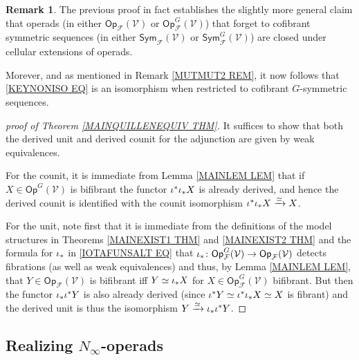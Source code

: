 \documentclass[a4paper,10pt
,draft
]{article}%
\numberwithin{equation}{section}
\numberwithin{figure}{section}
\theoremstyle{definition} %
\newtheorem{remark}[equation]{Remark}%
\newcommand{\1}{\ensuremath{\mathbbm 1}}%
\begin{document}
\begin{remark}\label{INFACTEST REM}
The previous proof in fact establishes 
the slightly more general claim that operads 
(in either 
$\mathsf{Op}_{\mathcal{F}}(\mathcal{V})$ or
$\mathsf{Op}_{\mathcal{F}}^G(\mathcal{V})$)
that forget to cofibrant symmetric sequences
(in either 
$\mathsf{Sym}_{\mathcal{F}}(\mathcal{V})$ or
$\mathsf{Sym}_{\mathcal{F}}^G(\mathcal{V})$)
are closed under cellular extensions of operads.

Morever, and as mentioned in Remark \ref{MUTMUT2 REM},
it now follows that \eqref{KEYNONISO EQ}
is an isomorphism when restricted to cofibrant $G$-symmetric sequences.
\end{remark}



\begin{proof}[proof of Theorem \ref{MAINQUILLENEQUIV THM}]
        It suffices to show that both the derived unit and derived counit for the adjunction are given by weak equivalences.

        For the counit, it is immediate from Lemma \ref{MAINLEM LEM} that if $X \in \mathsf{Op}^G(\mathcal{V})$ is bifibrant
        the functor $\iota^{\**} \iota_{\**} X$ is already derived, and hence the derived counit is identified with the counit isomorphism $\iota^{\**} \iota_{\**} X \xrightarrow{\simeq} X$.

        For the unit, note first that it is immediate from the definitions
        of the model structures in Theorems 
        \ref{MAINEXIST1 THM} and \ref{MAINEXIST2 THM} 
        and the formula for $\iota_{\**}$ in \eqref{IOTAFUNSALT EQ}
        that 
        $\iota_{\**} \colon 
        \mathsf{Op}^{G}_{\mathcal{F}}(\mathcal{V})\to  
       \mathsf{Op}_{\mathcal{F}}(\mathcal{V})$
        detects fibrations (as well as weak equivalences)
        and thus, by Lemma \ref{MAINLEM LEM},
        that 
        $Y \in \mathsf{Op}_{\mathcal{F}}(\mathcal{V})$
        is bifibrant iff $Y \simeq \iota_{\**} X$
        for $X \in \mathsf{Op}^{G}_{\mathcal{F}}(\mathcal{V})$ bifibrant.
        But then the functor $\iota_{\**} \iota^{\**} Y$ 
        is also already derived (since $\iota^{\**} Y \simeq \iota^{\**}\iota_{\**} X \simeq X$ is fibrant) and the derived unit is thus the isomorphism
        $Y \xrightarrow{\simeq} \iota_{\**} \iota^{\**} Y$.
\end{proof}



\subsection{Realizing $N_{\infty}$-operads}
\label{NINFTY_SECTION}
\end{document}
